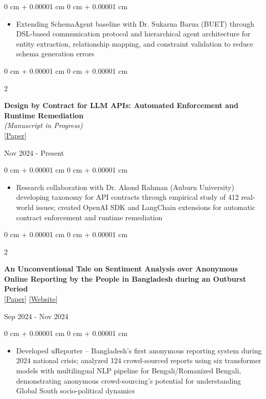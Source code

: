 \documentclass[10pt, letterpaper]{article}
\newenvironment{highlights}{
    \begin{itemize}[
        topsep=0.10 cm,
        parsep=0.10 cm,
        partopsep=0pt,
        itemsep=0pt,
        leftmargin=0 cm + 10pt
    ]
}{
    \end{itemize}
} %
\newenvironment{onecolentry}{
    \begin{adjustwidth}{
        0 cm + 0.00001 cm
    }{
        0 cm + 0.00001 cm
    }
}{
    \end{adjustwidth}
} %
\newenvironment{twocolentry}[2][]{
    \onecolentry
    \def\secondColumn{#2}
    \setcolumnwidth{\fill, 4.5 cm}
    \begin{paracol}{2}
}{
    \switchcolumn \raggedleft \secondColumn
    \end{paracol}
    \endonecolentry
} %
\begin{document}
\begin{onecolentry}
    \begin{highlights}
        \item Extending SchemaAgent baseline with Dr. Sukarna Barua (BUET) through DSL-based communication protocol and hierarchical agent architecture for entity extraction, relationship mapping, and constraint validation to reduce schema generation errors
    \end{highlights}
\end{onecolentry}

\begin{twocolentry}{
    Nov 2024 - Present
}

\textbf{Design by Contract for LLM APIs: Automated Enforcement and Runtime Remediation} \\
\textit{(Manuscript in Progress)} \\
\href{https://tanzimhromel.com/assets/pdf/llm-api-contracts.pdf}{[Paper]}

\end{twocolentry}

\begin{onecolentry}
    \begin{highlights}
        \item Research collaboration with Dr. Akond Rahman (Auburn University) developing taxonomy for API contracts through empirical study of 412 real-world issues; created OpenAI SDK and LangChain extensions for automatic contract enforcement and runtime remediation
    \end{highlights}
\end{onecolentry}

    \begin{twocolentry}{Sep 2024 - Nov 2024}
    \textbf{An Unconventional Tale on Sentiment Analysis over Anonymous Online Reporting by the People in Bangladesh during an Outburst Period} \\
    \href{https://tanzimhromel.com/assets/pdf/Ureporter.pdf}{[Paper]}
    \href{https://ureporter.cse.buet.ac.bd/about_us}{[Website]}
\end{twocolentry}

\begin{onecolentry}
    \begin{highlights}
        \item Developed uReporter -- Bangladesh's first anonymous reporting system during 2024 national crisis; analyzed 124 crowd-sourced reports using six transformer models with multilingual NLP pipeline for Bengali/Romanized Bengali, demonstrating anonymous crowd-sourcing's potential for understanding Global South socio-political dynamics
    \end{highlights}
\end{onecolentry}
\end{document}
